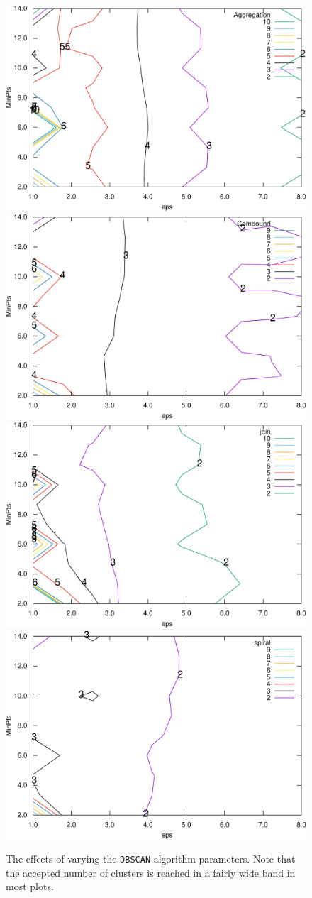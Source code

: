 \documentclass[12pt]{article}
\begin{document}
\begin{figure}[ht]
\centering
\includegraphics[width=0.47\linewidth]{../plots/dbscan/Aggregation_contour-crop}
\includegraphics[width=0.47\linewidth]{../plots/dbscan/Compound_contour-crop} \\
\includegraphics[width=0.47\linewidth]{../plots/dbscan/jain_contour-crop}
\includegraphics[width=0.47\linewidth]{../plots/dbscan/spiral_contour-crop}
\caption{The effects of varying the \texttt{DBSCAN} algorithm parameters. Note that the accepted number of clusters is reached in a fairly wide band in most plots.}
\label{fig:DBSCANplots}
\end{figure}
\end{document}
